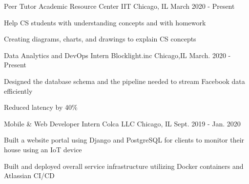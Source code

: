 

\begin{cventries}
  \cventry
    {Peer Tutor} %
    {Academic Resource Center IIT} %
    {Chicago, IL} %
    {March 2020 - Present} %
    {
      \begin{cvitems} %
        \item {Help CS students with understanding concepts and with homework}
        \item {Creating diagrams, charts, and drawings to explain CS concepts}
      \end{cvitems}
    }
  \cventry
    {Data Analytics and DevOps Intern} %
    {Blocklight.inc} %
    {Chicago,IL} %
    {March. 2020 - Present} %
    {
      \begin{cvitems} %
        \item {Designed the database schema and the pipeline needed to stream Facebook data efficiently}
        \item {Reduced latency by 40\%} %
      \end{cvitems}
    }

  \cventry
    {Mobile \& Web Developer Intern} %
    {Colca LLC} %
    {Chicago, IL} %
    {Sept. 2019 - Jan. 2020} %
    {
      \begin{cvitems} %
        \item {Built a website portal using Django and PostgreSQL for clients to monitor their house using an IoT device}
        \item {Built and deployed overall service infrastructure utilizing Docker containers and Atlassian CI/CD}
      \end{cvitems}
    }


\end{cventries}
